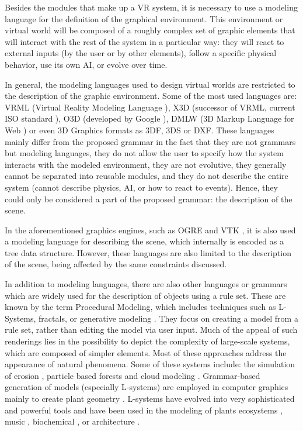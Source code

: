 \documentclass[twocolumn]{svjour3}
\begin{document}
Besides the modules that make up a VR system, it is necessary to use a modeling language for the
definition of the graphical environment. This environment or virtual world will be composed of a
roughly complex set of graphic elements that will interact with the rest of the system in a
particular way: they will react to external inputs (by the user or by other elements), follow a
specific physical behavior, use its own AI, or evolve over time.

In general, the modeling languages used to design virtual worlds \cite{Bartle2004} are restricted
to the description of the graphic environment. Some of the most used languages are: VRML (Virtual
Reality Modeling Language \cite{Web3D}), X3D (successor of VRML, current ISO standard
\cite{Web3D}), O3D (developed by Google \cite{O3D}), DMLW (3D Markup Language for Web \cite{DMLW})
or even 3D Graphics formats as 3DF, 3DS or DXF. These languages mainly differ from the proposed
grammar in the fact that they are not grammars but modeling languages, they do not allow the user
to specify how the system interacts with the modeled environment, they are not evolutive, they
generally cannot be separated into reusable modules, and they do not describe the entire system
(cannot describe physics, AI, or how to react to events). Hence, they could only be considered a
part of the proposed grammar: the description of the scene.

In the aforementioned graphics engines, such as OGRE \cite{OGRE} and VTK \cite{VTK}, it is also
used a modeling language for describing the scene, which internally is encoded as a tree data
structure. However, these languages are also limited to the description of the scene, being
affected by the same constraints discussed.

In addition to modeling languages, there are also other languages or grammars which are widely used
for the description of objects using a rule set. These are known by the term Procedural Modeling,
which includes techniques such as L-Systems, fractals, or generative modeling \cite{Yoav2001}. They
focus on creating a model from a rule set, rather than editing the model via user input. Much of
the appeal of such renderings lies in the possibility to depict the complexity of large-scale
systems, which are composed of simpler elements. Most of these approaches address the appearance of
natural phenomena. Some of these systems include: the simulation of erosion \cite{Musgrave1990},
particle based forests \cite{Reeves1985} and cloud modeling \cite{Perlin1985}. Grammar-based
generation of models (especially L-systems) are employed in computer graphics mainly to create
plant geometry \cite{Lindenmayer1990,Lindenmayer1992}. L-systems have evolved into very
sophisticated and powerful tools \cite{Prusinkiewicz2008,Palubicki2009} and have been used in the
modeling of plants ecosystems \cite{Prusinkiewicz2000}, music \cite{Manousakis2006}, biochemical
\cite{Spicher2008}, or architecture \cite{Yoav2001,Muller2006,Wang2008}.
\end{document}
